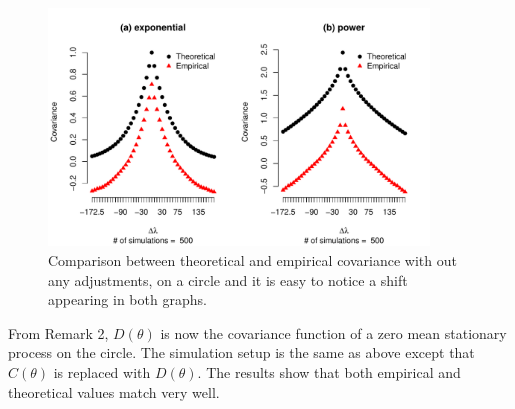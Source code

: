 
      \begin{figure}[H]
      	\label{covarince_circle}
      	\centering
       	\includegraphics[width=0.9\textwidth]{graphs/covarince_circle}
      	\caption[omparison between theoretical and empirical covariance with out any] {Comparison between theoretical and empirical covariance with out any adjustments, on a circle and it is easy to notice a shift appearing in both graphs.}
      \end{figure}

From Remark 2, $D(\theta)$ is now the covariance function of a zero mean stationary process on the circle. The simulation setup is the same as above except that $C(\theta)$ is replaced with $D(\theta)$. The results show that both empirical and theoretical values match very well. 

	      	
